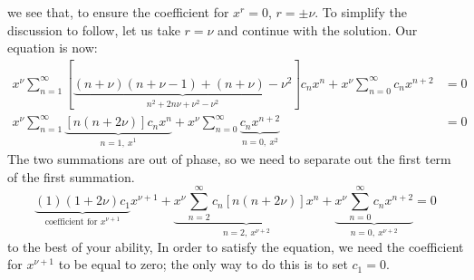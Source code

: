 we see that, to ensure the coefficient for $x^r = 0$, $r = \pm \nu$.
To simplify the discussion to follow, let us take $r = \nu$ and continue with the solution.  Our equation is now: 
\begin{align*}
x^{\nu}\sum\limits_{n=1}^{\infty}\left[\underbrace{(n+\nu)(n+\nu-1) + (n+\nu)-\nu^2}_{n^2+2n\nu+\nu^2 - \nu^2} \right]c_nx^n + x^{\nu}\sum\limits_{n=0}^{\infty}c_n x^{n+2} &= 0 \\
x^{\nu}\sum\limits_{n=1}^{\infty} \underbrace{\left[n(n+2\nu) \right]c_nx^n}_{n=1, \ x^1} + x^{\nu}\sum\limits_{n=0}^{\infty}\underbrace{c_nx^{n+2}}_{n=0, \ x^2} &= 0
\end{align*}
The two summations are out of phase, so we need to separate out the first term of the first summation.
\begin{equation*}
\underbrace{(1)(1+2\nu)c_1}_{\text{coefficient for }x^{\nu+1}}x^{\nu+1} + \underbrace{x^{\nu}\sum\limits_{n=2}^{\infty}c_n[n(n+2\nu)]x^n}_{n=2, \ x^{\nu+2}} + \underbrace{x^{\nu}\sum\limits_{n=0}^{\infty}c_nx^{n+2}}_{n=0, \ x^{\nu+2}} = 0
\end{equation*}to the best of your ability,
In order to satisfy the equation, we need the coefficient for $x^{\nu+1}$ to be equal to zero; the only way to do this is to set $c_1 = 0$.

